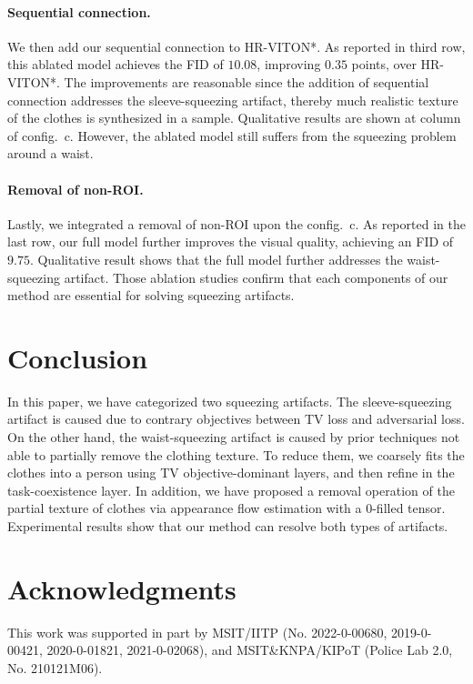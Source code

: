 \documentclass[letterpaper]{article} %
\begin{document}
\paragraph{Sequential connection.} We then add our sequential connection to HR-VITON*.
As reported in third row, this ablated model achieves the FID of $10.08$, improving $0.35$ points, over HR-VITON*.
The improvements are reasonable since the addition of sequential connection addresses the sleeve-squeezing artifact, thereby much realistic texture of the clothes is synthesized in a sample.
Qualitative results are shown at column of config.~{\sc c}.
However, the ablated model still suffers from the squeezing problem around a waist.

\paragraph{Removal of non-ROI.} Lastly, we integrated a removal of non-ROI upon the config.~{\sc c}.
As reported in the last row, our full model further improves the visual quality, achieving an FID of $9.75$.
Qualitative result shows that the full model further addresses the waist-squeezing artifact.
Those ablation studies confirm that each components of our method are essential for solving squeezing artifacts.

\section{Conclusion}
\label{sec_conclude}

In this paper, we have categorized two squeezing artifacts.
The sleeve-squeezing artifact is caused due to contrary objectives between TV loss and adversarial loss.
On the other hand, the waist-squeezing artifact is caused by prior techniques not able to partially remove the clothing texture.
To reduce them, we coarsely fits the clothes into a person using TV objective-dominant layers, and then refine in the task-coexistence layer.
In addition, we have proposed a removal operation of the partial texture of clothes via appearance flow estimation with a 0-filled tensor.
Experimental results show that our method can resolve both types of artifacts.

\section*{Acknowledgments}
This work was supported in part by MSIT/IITP (No. 2022-0-00680, 2019-0-00421, 2020-0-01821, 2021-0-02068), and MSIT\&KNPA/KIPoT (Police Lab 2.0, No. 210121M06).
\end{document}
